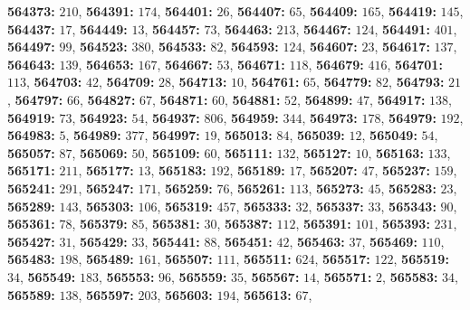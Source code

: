 \textsf{\bfseries 564373:} $210$, \textsf{\bfseries 564391:} $174$, \textsf{\bfseries 564401:} $26$, \textsf{\bfseries 564407:} $65$, \textsf{\bfseries 564409:} $165$, \textsf{\bfseries 564419:} $145$, \textsf{\bfseries 564437:} $17$, \textsf{\bfseries 564449:} $13$, \textsf{\bfseries 564457:} $73$, \textsf{\bfseries 564463:} $213$, \textsf{\bfseries 564467:} $124$, \textsf{\bfseries 564491:} $401$, \textsf{\bfseries 564497:} $99$, \textsf{\bfseries 564523:} $380$, \textsf{\bfseries 564533:} $82$, \textsf{\bfseries 564593:} $124$, \textsf{\bfseries 564607:} $23$, \textsf{\bfseries 564617:} $137$, \textsf{\bfseries 564643:} $139$, \textsf{\bfseries 564653:} $167$, \textsf{\bfseries 564667:} $53$, \textsf{\bfseries 564671:} $118$, \textsf{\bfseries 564679:} $416$, \textsf{\bfseries 564701:} $113$, \textsf{\bfseries 564703:} $42$, \textsf{\bfseries 564709:} $28$, \textsf{\bfseries 564713:} $10$, \textsf{\bfseries 564761:} $65$, \textsf{\bfseries 564779:} $82$, \textsf{\bfseries 564793:} $21$, \textsf{\bfseries 564797:} $66$, \textsf{\bfseries 564827:} $67$, \textsf{\bfseries 564871:} $60$, \textsf{\bfseries 564881:} $52$, \textsf{\bfseries 564899:} $47$, \textsf{\bfseries 564917:} $138$, \textsf{\bfseries 564919:} $73$, \textsf{\bfseries 564923:} $54$, \textsf{\bfseries 564937:} $806$, \textsf{\bfseries 564959:} $344$, \textsf{\bfseries 564973:} $178$, \textsf{\bfseries 564979:} $192$, \textsf{\bfseries 564983:} $5$, \textsf{\bfseries 564989:} $377$, \textsf{\bfseries 564997:} $19$, \textsf{\bfseries 565013:} $84$, \textsf{\bfseries 565039:} $12$, \textsf{\bfseries 565049:} $54$, \textsf{\bfseries 565057:} $87$, \textsf{\bfseries 565069:} $50$, \textsf{\bfseries 565109:} $60$, \textsf{\bfseries 565111:} $132$, \textsf{\bfseries 565127:} $10$, \textsf{\bfseries 565163:} $133$, \textsf{\bfseries 565171:} $211$, \textsf{\bfseries 565177:} $13$, \textsf{\bfseries 565183:} $192$, \textsf{\bfseries 565189:} $17$, \textsf{\bfseries 565207:} $47$, \textsf{\bfseries 565237:} $159$, \textsf{\bfseries 565241:} $291$, \textsf{\bfseries 565247:} $171$, \textsf{\bfseries 565259:} $76$, \textsf{\bfseries 565261:} $113$, \textsf{\bfseries 565273:} $45$, \textsf{\bfseries 565283:} $23$, \textsf{\bfseries 565289:} $143$, \textsf{\bfseries 565303:} $106$, \textsf{\bfseries 565319:} $457$, \textsf{\bfseries 565333:} $32$, \textsf{\bfseries 565337:} $33$, \textsf{\bfseries 565343:} $90$, \textsf{\bfseries 565361:} $78$, \textsf{\bfseries 565379:} $85$, \textsf{\bfseries 565381:} $30$, \textsf{\bfseries 565387:} $112$, \textsf{\bfseries 565391:} $101$, \textsf{\bfseries 565393:} $231$, \textsf{\bfseries 565427:} $31$, \textsf{\bfseries 565429:} $33$, \textsf{\bfseries 565441:} $88$, \textsf{\bfseries 565451:} $42$, \textsf{\bfseries 565463:} $37$, \textsf{\bfseries 565469:} $110$, \textsf{\bfseries 565483:} $198$, \textsf{\bfseries 565489:} $161$, \textsf{\bfseries 565507:} $111$, \textsf{\bfseries 565511:} $624$, \textsf{\bfseries 565517:} $122$, \textsf{\bfseries 565519:} $34$, \textsf{\bfseries 565549:} $183$, \textsf{\bfseries 565553:} $96$, \textsf{\bfseries 565559:} $35$, \textsf{\bfseries 565567:} $14$, \textsf{\bfseries 565571:} $2$, \textsf{\bfseries 565583:} $34$, \textsf{\bfseries 565589:} $138$, \textsf{\bfseries 565597:} $203$, \textsf{\bfseries 565603:} $194$, \textsf{\bfseries 565613:} $67$, 
